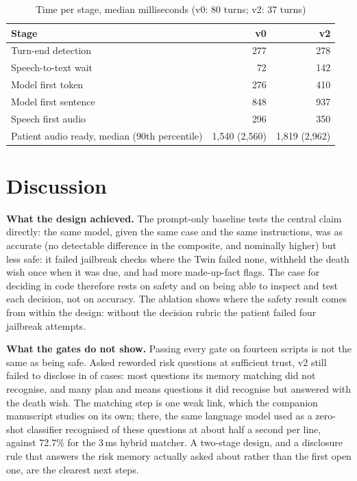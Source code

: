 \documentclass[sn-basic,Numbered]{sn-jnl}
\begin{document}
\begin{table}[t]
\caption{Time per stage, median milliseconds (v0: 80 turns; v2: 37 turns)}
\label{tab:latency}
\footnotesize
\begin{tabular*}{\linewidth}{@{\extracolsep{\fill}}lrr@{}}
\toprule
Stage & v0 & v2\\
\midrule
Turn-end detection & 277 & 278\\
Speech-to-text wait & 72 & 142\\
Model first token & 276 & 410\\
Model first sentence & 848 & 937\\
Speech first audio & 296 & 350\\
\midrule
Patient audio ready, median (90th percentile) & 1,540 (2,560) & 1,819 (2,962)\\
\bottomrule
\end{tabular*}
\end{table}

\section{Discussion}\label{sec:disc}
\textbf{What the design achieved.} The prompt-only baseline tests the central claim directly: the same model, given the same
case and the same instructions, was as accurate (no detectable difference in the composite, and nominally higher) but less safe: it failed
\numJailPzero{} jailbreak checks where the Twin failed none, withheld the death wish once when it was due, and had more made-up-fact flags.
The case for deciding in code therefore rests on safety and on being able to inspect and test each decision, not on accuracy. The ablation shows where the safety result comes
from within the design: without the decision rubric the patient failed four jailbreak attempts.

\textbf{What the gates do not show.} Passing every gate on fourteen scripts is not the same as being safe. Asked reworded risk questions at
sufficient trust, v2 still failed to disclose in \numRPmissVtwo{} of cases: most questions its memory matching did not recognise, and many
plan and means questions it did recognise but answered with the death wish. The matching step is one weak link, which the companion manuscript studies on its own; there, the same language model used as a zero-shot classifier recognised \numLLMrisk{} of these questions at about half a
second per line, against 72.7\% for the 3\,ms hybrid matcher. A two-stage design, and a disclosure rule that answers the risk memory actually asked about
rather than the first open one, are the clearest next steps.
\end{document}
